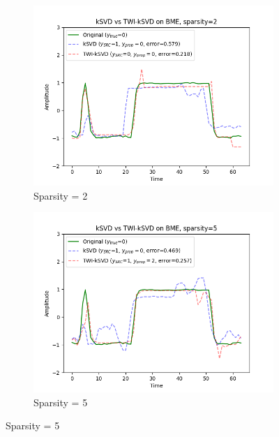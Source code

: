 \documentclass[10pt,twocolumn,letterpaper]{article}
\begin{document}
\begin{figure}
    \centering
    \begin{subfigure}[t]{\textwidth}
        \centering
        \includegraphics[scale=0.6]{../../figures/1D_example_sparsity_2.png}
        \caption{Sparsity = 2}
    \end{subfigure}
    
    \begin{subfigure}[t]{\textwidth}
        \centering
        \includegraphics[scale=0.6]{../../figures/1D_example_sparsity_5.png}
        \caption{Sparsity = 5}
    \end{subfigure}


\end{figure}
\end{document}
